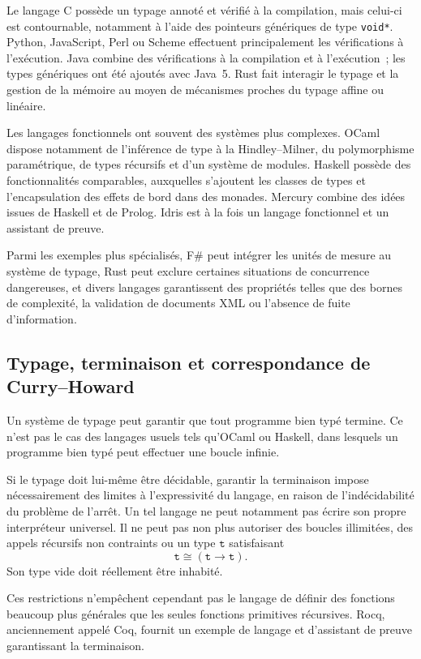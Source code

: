 Le langage C possède un typage annoté et vérifié à la compilation, mais
celui-ci est contournable, notamment à l'aide des pointeurs génériques
de type \texttt{void*}. Python, JavaScript, Perl ou Scheme effectuent
principalement les vérifications à l'exécution. Java combine des
vérifications à la compilation et à l'exécution ; les types génériques
ont été ajoutés avec Java 5. Rust fait interagir le typage et la gestion
de la mémoire au moyen de mécanismes proches du typage affine ou
linéaire.

Les langages fonctionnels ont souvent des systèmes plus complexes.
OCaml dispose notamment de l'inférence de type à la Hindley--Milner, du
polymorphisme paramétrique, de types récursifs et d'un système de
modules. Haskell possède des fonctionnalités comparables, auxquelles
s'ajoutent les classes de types et l'encapsulation des effets de bord
dans des monades. Mercury combine des idées issues de Haskell et de
Prolog. Idris est à la fois un langage fonctionnel et un assistant de
preuve.

Parmi les exemples plus spécialisés, F\# peut intégrer les unités de
mesure au système de typage, Rust peut exclure certaines situations de
concurrence dangereuses, et divers langages garantissent des propriétés
telles que des bornes de complexité, la validation de documents XML ou
l'absence de fuite d'information.

\subsection{Typage, terminaison et correspondance de Curry--Howard}

\thingy\label{typing-and-termination} Un système de typage peut garantir
que tout programme bien typé termine. Ce n'est pas le cas des langages
usuels tels qu'OCaml ou Haskell, dans lesquels un programme bien typé
peut effectuer une boucle infinie.

Si le typage doit lui-même être décidable, garantir la terminaison
impose nécessairement des limites à l'expressivité du langage, en
raison de l'indécidabilité du problème de l'arrêt. Un tel langage ne
peut notamment pas écrire son propre interpréteur universel. Il ne
peut pas non plus autoriser des boucles illimitées, des appels récursifs
non contraints ou un type $\mathtt{t}$ satisfaisant
\[
\mathtt{t}\cong(\mathtt{t}\rightarrow\mathtt{t}).
\]
Son type vide doit réellement être inhabité.

Ces restrictions n'empêchent cependant pas le langage de définir des
fonctions beaucoup plus générales que les seules fonctions primitives
récursives. Rocq, anciennement appelé Coq, fournit un exemple de
langage et d'assistant de preuve garantissant la terminaison.

